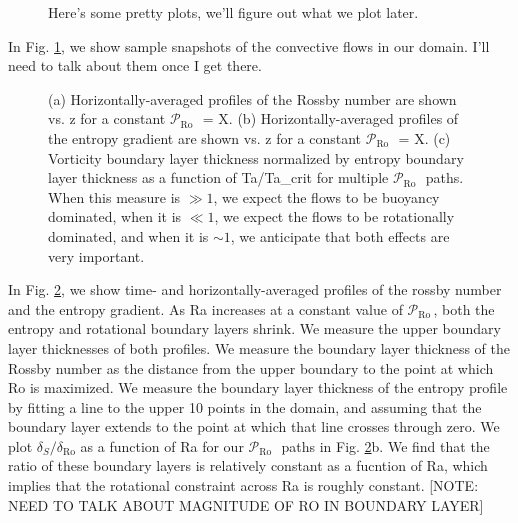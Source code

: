 \documentclass[twocolumn, amsmath, amsfonts, amssymb]{aastex62}
\newcommand{\pro}{\ensuremath{\mathcal{P}_{\text{Ro}}\,}}
\begin{document}
\begin{figure}[h]
\caption{ Here's some pretty plots, we'll figure out what we plot later.
\label{fig:pretty_convection} }
\end{figure}

In Fig. \ref{fig:pretty_convection}, we show sample snapshots of the convective flows in
our domain. I'll need to talk about them once I get there.

\begin{figure}[h]
\caption{(a) Horizontally-averaged profiles of the Rossby number are shown
vs. z for a constant \pro$\,$ = X. (b) Horizontally-averaged profiles of 
the entropy gradient are shown vs. z for a constant \pro$\,$ = X.
(c) Vorticity boundary layer thickness normalized by entropy boundary layer
thickness as a function of Ta/Ta\_crit for multiple \pro$\,$ paths.
When this measure is $\gg 1$, we expect the flows to be buoyancy dominated,
when it is $\ll 1$, we expect the flows to be rotationally dominated,
and when it is $\sim 1$, we anticipate that both effects are very important.
\label{fig:profiles_and_bls} }
\end{figure}

In Fig. \ref{fig:profiles_and_bls}, we show time- and horizontally-averaged profiles of
the rossby number and the entropy gradient. As Ra increases at a constant value of
\pro, both the entropy and rotational boundary layers shrink. We measure the
upper boundary layer thicknesses of both profiles. We measure the boundary layer thickness
of the Rossby number as the distance from the upper boundary to the point at which Ro
is maximized. We measure the boundary layer thickness of the entropy profile by fitting
a line to the upper 10 points in the domain, and assuming that the boundary layer extends to
the point at which that line crosses through zero. We plot $\delta_S/\delta_{\text{Ro}}$
as a function of Ra for our \pro$\,$ paths in Fig. \ref{fig:profiles_and_bls}b. We find
that the ratio of these boundary layers is relatively constant as a fucntion of Ra, which
implies that the rotational constraint across Ra is roughly constant.
[NOTE: NEED TO TALK ABOUT MAGNITUDE OF RO IN BOUNDARY LAYER]
\end{document}
